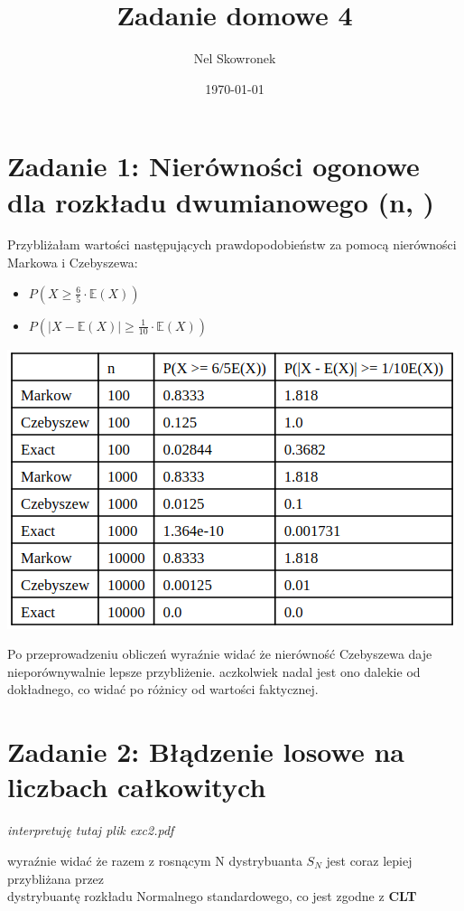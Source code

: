 \documentclass{article}
\title{Zadanie domowe 4}
\author{Nel Skowronek}
\date{\today}
\begin{document}
\maketitle

\section*{Zadanie 1: Nierówności ogonowe dla rozkładu dwumianowego \left(n, \right)}

Przybliżałam wartości następujących prawdopodobieństw za pomocą nierówności Markowa i Czebyszewa:
\begin{itemize}
    \item \( P\left(X \geq \frac{6}{5} \cdot \mathbb{E}(X)\right) \)
    \item \( P\left( \left| X - \mathbb{E}(X) \right| \geq \frac{1}{10} \cdot \mathbb{E}(X) \right) \)
\end{itemize}


\hspace*{-0cm} \includegraphics[scale=0.5]{./plots/exc1.png}

Po przeprowadzeniu obliczeń wyraźnie widać że nierówność Czebyszewa daje nieporównywalnie lepsze przybliżenie.
aczkolwiek nadal jest ono dalekie od dokładnego, co widać po różnicy od wartości faktycznej. \\

\section*{Zadanie 2: Błądzenie losowe na liczbach całkowitych}

\textit{interpretuję tutaj plik exc2.pdf}

wyraźnie widać że razem z rosnącym N dystrybuanta \( S_N \) jest coraz lepiej przybliżana przez \\
dystrybuantę rozkładu Normalnego standardowego, co jest zgodne z \textbf{CLT} \\
\end{document}
